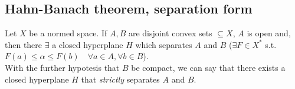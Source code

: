 \subsection{Hahn-Banach theorem, separation form}
Let $X $ be a normed space. If $A,B$ are disjoint convex sets $\subseteq X$, $A$ is open and, then there $\exists $ a closed hyperplane $H$ which separates $A$ and $B$ ($\exists F \in X^*$ s.t. $F(a) \le \alpha \le F(b) \quad \forall a \in A, \forall b \in B$).
\\
With the further hypotesis that $B$ be compact, we can say that there exists a closed hyperplane $H$ that \emph{strictly} separates $A$ and $B$.
